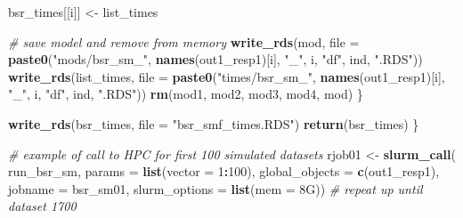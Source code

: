 \documentclass[12pt, twoside]{amherstthesis}
\newenvironment{Shaded}{\begin{snugshade}}{\end{snugshade}}
\newcommand{\AttributeTok}[1]{\textcolor[rgb]{0.13,0.29,0.53}{#1}}
\newcommand{\CommentTok}[1]{\textcolor[rgb]{0.56,0.35,0.01}{\textit{#1}}}
\newcommand{\DecValTok}[1]{\textcolor[rgb]{0.00,0.00,0.81}{#1}}
\newcommand{\FunctionTok}[1]{\textcolor[rgb]{0.13,0.29,0.53}{\textbf{#1}}}
\newcommand{\NormalTok}[1]{#1}
\newcommand{\OtherTok}[1]{\textcolor[rgb]{0.56,0.35,0.01}{#1}}
\newcommand{\SpecialCharTok}[1]{\textcolor[rgb]{0.81,0.36,0.00}{\textbf{#1}}}
\newcommand{\StringTok}[1]{\textcolor[rgb]{0.31,0.60,0.02}{#1}}
\begin{document}
\begin{Shaded}
\begin{Highlighting}[]
\NormalTok{    bsr\_times[[i]] }\OtherTok{\textless{}{-}}\NormalTok{ list\_times}
    
    \CommentTok{\# save model and remove from memory}
    \FunctionTok{write\_rds}\NormalTok{(mod, }\AttributeTok{file =} 
                \FunctionTok{paste0}\NormalTok{(}\StringTok{"mods/bsr\_sm\_"}\NormalTok{, }\FunctionTok{names}\NormalTok{(out1\_resp1)[i], }\StringTok{"\_"}\NormalTok{, i, }
                       \StringTok{"df"}\NormalTok{, ind, }\StringTok{".RDS"}\NormalTok{))}
    \FunctionTok{write\_rds}\NormalTok{(list\_times, }\AttributeTok{file =} 
                 \FunctionTok{paste0}\NormalTok{(}\StringTok{"times/bsr\_sm\_"}\NormalTok{, }\FunctionTok{names}\NormalTok{(out1\_resp1)[i], }\StringTok{"\_"}\NormalTok{, i, }
                        \StringTok{"df"}\NormalTok{, ind, }\StringTok{".RDS"}\NormalTok{))}
    \FunctionTok{rm}\NormalTok{(mod1, mod2, mod3, mod4, mod)}
\NormalTok{  \}}
  
  \FunctionTok{write\_rds}\NormalTok{(bsr\_times, }\AttributeTok{file =} \StringTok{"bsr\_smf\_times.RDS"}\NormalTok{)}
  \FunctionTok{return}\NormalTok{(bsr\_times)}
\NormalTok{\}}

\CommentTok{\# example of call to HPC for first 100 simulated datasets}
\NormalTok{rjob01 }\OtherTok{\textless{}{-}} \FunctionTok{slurm\_call}\NormalTok{(}
\NormalTok{  run\_bsr\_sm, }\AttributeTok{params =} \FunctionTok{list}\NormalTok{(}\AttributeTok{vector =} \DecValTok{1}\SpecialCharTok{:}\DecValTok{100}\NormalTok{),}
  \AttributeTok{global\_objects =} \FunctionTok{c}\NormalTok{(}\StringTok{\textquotesingle{}out1\_resp1\textquotesingle{}}\NormalTok{),}
  \AttributeTok{jobname =} \StringTok{\textquotesingle{}bsr\_sm01\textquotesingle{}}\NormalTok{,}
  \AttributeTok{slurm\_options =} \FunctionTok{list}\NormalTok{(}\AttributeTok{mem =} \StringTok{\textquotesingle{}8G\textquotesingle{}}\NormalTok{))}
  \CommentTok{\# repeat up until dataset 1700}
\end{Highlighting}
\end{Shaded}
\normalsize
\end{document}
